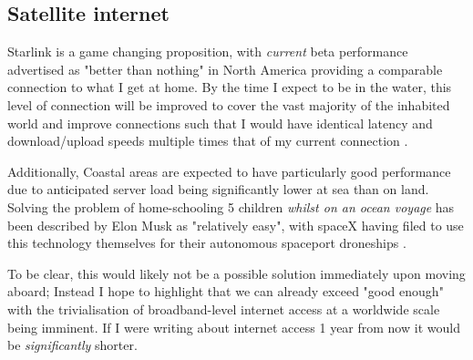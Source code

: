 \subsection{Satellite internet}
Starlink is a game changing proposition, with \textit{current} beta performance advertised as "better than nothing" in North America providing a comparable connection to what I get at home. By the time I expect to be in the water, this level of connection will be improved to cover the vast majority of the inhabited world and improve connections such that I would have identical latency and download/upload speeds multiple times that of my current connection \cite{starlink-FAQ}.

Additionally, Coastal areas are expected to have particularly good performance due to anticipated server load being significantly lower at sea than on land. Solving the problem of home-schooling 5 children \textit{whilst on an ocean voyage} has been described by Elon Musk as "relatively easy", with spaceX having filed to use this technology themselves for their autonomous spaceport droneships \cite{starlink-ocean-feasibility}.

To be clear, this would likely not be a possible solution immediately upon moving aboard; Instead I hope to highlight that we can already exceed "good enough" with the trivialisation of broadband-level internet access at a worldwide scale being imminent. If I were writing about internet access 1 year from now it would be \textit{significantly} shorter.